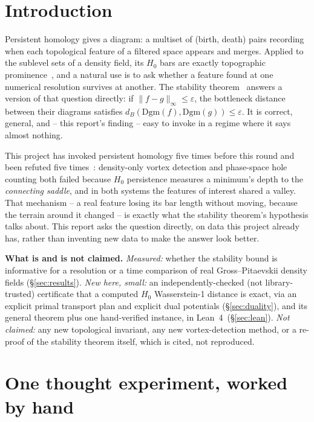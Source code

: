 \documentclass[11pt,a4paper]{article}
\newcommand{\dB}{d_{B}}
\begin{document}
\section{Introduction}

Persistent homology gives a diagram: a multiset of (birth, death) pairs recording when each topological
feature of a filtered space appears and merges. Applied to the sublevel sets of a density field, its
$H_0$ bars are exactly topographic prominence~\cite{Callens2026TDA}, and a natural use is to ask whether
a feature found at one numerical resolution survives at another. The stability
theorem~\cite{CohenSteiner2007} answers a version of that question directly: if $\|f-g\|_\infty\le
\varepsilon$, the bottleneck distance between their diagrams satisfies $\dB(\mathrm{Dgm}(f),
\mathrm{Dgm}(g))\le\varepsilon$. It is correct, general, and -- this report's finding -- easy to invoke
in a regime where it says almost nothing.

This project has invoked persistent homology five times before this round and been refuted five
times~\cite{Callens2026TDA}: density-only vortex detection and phase-space hole counting both failed
because $H_0$ persistence measures a minimum's depth to the \emph{connecting saddle}, and in both systems
the features of interest shared a valley. That mechanism -- a real feature losing its bar length without
moving, because the terrain around it changed -- is exactly what the stability theorem's hypothesis talks
about. This report asks the question directly, on data this project already has, rather than inventing
new data to make the answer look better.

\begin{keybox}
\textbf{What is and is not claimed.} \emph{Measured:} whether the stability bound is informative for a
resolution or a time comparison of real Gross--Pitaevskii density fields (\S\ref{sec:results}). \emph{New
here, small:} an independently-checked (not library-trusted) certificate that a computed $H_0$
Wasserstein-1 distance is exact, via an explicit primal transport plan and explicit dual potentials
(\S\ref{sec:duality}), and its general theorem plus one hand-verified instance, in
Lean~4~(\S\ref{sec:lean}). \emph{Not claimed:} any new topological invariant, any new vortex-detection
method, or a re-proof of the stability theorem itself, which is cited, not reproduced.
\end{keybox}

\section{One thought experiment, worked by hand}
\label{sec:toy}
\end{document}
